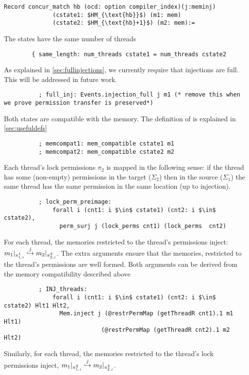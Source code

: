 \begin{lstlisting}[firstnumber=1]
      Record concur_match hb (ocd: option compiler_index)(j:meminj)
              (cstate1: $HM_{\text{hb}}$) (m1: mem) 
              (cstate2: $HM_{\text{hb}+1}$) (m2: mem):=
\end{lstlisting}     
\noindent The states have the same number of threads
\begin{lstlisting}
        { same_length: num_threads cstate1 = num_threads cstate2
\end{lstlisting}     
\noindent As explained in \cref{sec:fullinjections}, we currently require that injections are full. This will be addressed in future work.
\begin{lstlisting}
          ; full_inj: Events.injection_full j m1 (* remove this when we prove permission transfer is preserved*)
\end{lstlisting}     
\noindent Both states are compatible with the memory. The definition of  is explained in \cref{sec:usefuldefs}
\begin{lstlisting}
          ; memcompat1: mem_compatible cstate1 m1
          ; memcompat2: mem_compatible cstate2 m2
\end{lstlisting}     
\noindent Each thread's lock permissions $\pi_2$ is mapped in the following sense: if the thread has some (non-empty) permissions in the target ($\Sigma_2$) then in the source ($\Sigma_1$) the same thread has the same permission in the same location (up to injection).
\begin{lstlisting}
          ; lock_perm_preimage:
              forall i (cnt1: i $\in$ cstate1) (cnt2: i $\in$  cstate2),
                perm_surj j (lock_perms cnt1) (lock_perms  cnt2)
\end{lstlisting}     
\noindent For each thread, the memories restricted to the thread's permissions inject: $m_1 |_{\pi^1_{1,i}} \overset{j}{\hookrightarrow} m_2 |_{\pi^2_{2,i}}$. The extra arguments  ensure that the memories, restricted to the thread's permissions are well formed. Both arguments can be derived from the memory compatibility described above 
\begin{lstlisting}
          ; INJ_threads:
              forall i (cnt1: i $\in$ cstate1) (cnt2: i $\in$  cstate2) Hlt1 Hlt2,
                Mem.inject j (@restrPermMap (getThreadR cnt1).1 m1 Hlt1)
                            (@restrPermMap (getThreadR cnt2).1 m2 Hlt2)
\end{lstlisting}     
\noindent Similarly, for each thread, the memories restricted to the thread's lock permissions inject, $m_1 |_{\pi^2_{1,i}} \overset{j}{\hookrightarrow} m_2 |_{\pi^2_{2,i}}$. 
